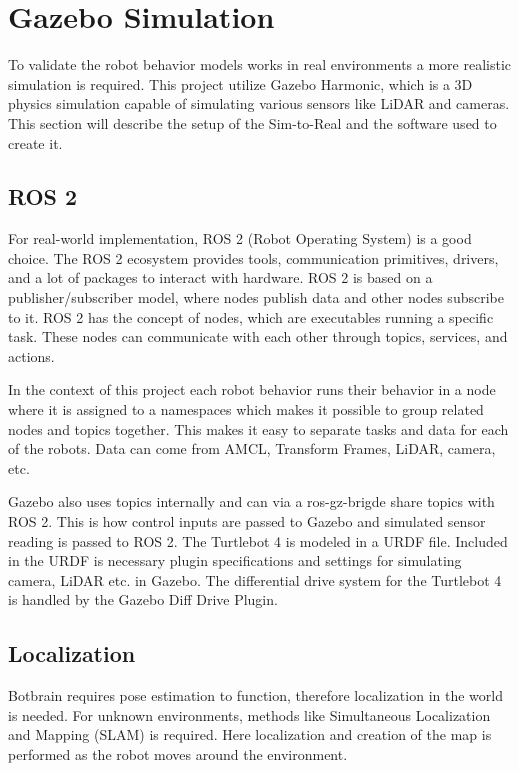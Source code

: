\section{Gazebo Simulation}
To validate the robot behavior models works in real environments a more realistic simulation is required.
This project utilize Gazebo Harmonic, which is a 3D physics simulation capable of simulating various sensors like LiDAR and cameras.
This section will describe the setup of the Sim-to-Real and the software used to create it.

\subsection{ROS 2}\label{sub:ros_2}
For real-world implementation, ROS 2 (Robot Operating System) is a good choice. The ROS 2 ecosystem provides tools, communication primitives, drivers, and a lot of packages to interact with hardware. ROS 2 is based on a publisher/subscriber model, where nodes publish data and other nodes subscribe to it.
ROS 2 has the concept of nodes, which are executables running a specific task. These nodes can communicate with each other through topics, services, and actions.

In the context of this project each robot behavior runs their behavior in a node where it is assigned to a namespaces which makes it possible to group related nodes and topics together. 
This makes it easy to separate tasks and data for each of the robots. Data can come from AMCL, Transform Frames, LiDAR, camera, etc.

Gazebo also uses topics internally and can via a ros-gz-brigde share topics with ROS 2. This is how control inputs are passed to Gazebo and simulated sensor reading is passed to ROS 2.
The Turtlebot 4 is modeled in a URDF file. Included in the URDF is necessary plugin specifications and settings for simulating camera, LiDAR etc. in Gazebo. The differential drive system for the Turtlebot 4 is handled by the Gazebo Diff Drive Plugin.

\subsection{Localization}\label{sub:localization} 
Botbrain requires pose estimation to function, therefore localization in the world is needed.
For unknown environments, methods like Simultaneous Localization and Mapping (SLAM) is required. Here localization and creation of the map is performed
as the robot moves around the environment.


